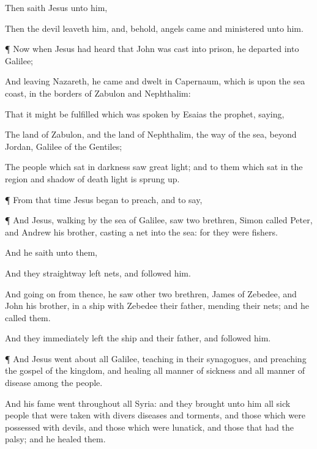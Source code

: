 {Then
saith
Jesus unto
him,
{}

Then the
devil
leaveth
him,
and,
behold,
angels
came
and
ministered unto
him.


\par }{\PP {}¶
Now when
Jesus had
heard
that
John was cast into
prison, he
departed
into
Galilee;

And
leaving
Nazareth, he
came and
dwelt
in
Capernaum,
which is upon the sea
coast,
in the
borders of
Zabulon
and
Nephthalim:

That it might be
fulfilled
which was
spoken
by
Esaias the
prophet,
saying,

The
land of
Zabulon,
and the
land of
Nephthalim,
{} the
way of the
sea,
beyond
Jordan,
Galilee of the
Gentiles;

The
people
which
sat
in
darkness
saw
great
light;
and to
them
which
sat
in the
region
and
shadow of
death
light is sprung
up.


\par }{\PP {}¶
From that
time
Jesus
began to
preach,
and to
say,
{}


\par }{\PP {}¶
And
Jesus,
walking
by the
sea of
Galilee,
saw
two
brethren,
Simon
called
Peter,
and
Andrew
his
brother,
casting a
net
into the
sea:
for they
were
fishers.

And he
saith unto
them,
{}

And
they
straightway
left
{}
nets, and
followed
him.

And going
on from
thence, he
saw
other
two
brethren,
James
{} of
Zebedee,
and
John
his
brother,
in a
ship
with
Zebedee
their
father,
mending
their
nets;
and he
called
them.

And they
immediately
left the
ship
and
their
father, and
followed
him.


\par }{\PP {}¶
And
Jesus went
about
all
Galilee,
teaching
in
their
synagogues,
and
preaching the
gospel of the
kingdom,
and
healing all manner
of
sickness
and all manner
of
disease
among the
people.

And
his
fame
went
throughout
all
Syria:
and they
brought unto
him
all sick
people that were
taken with
divers
diseases
and
torments,
and those which were possessed with
devils,
and those which were
lunatick,
and those that had the
palsy;
and he
healed
them.

}
